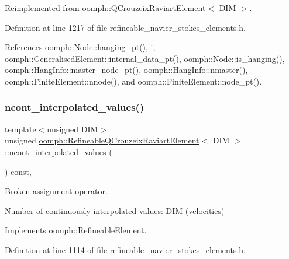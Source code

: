 Reimplemented from \hyperlink{classoomph_1_1QCrouzeixRaviartElement_ae57ed7defb77ccaa537a5d9caae68172}{oomph\+::\+Q\+Crouzeix\+Raviart\+Element$<$ D\+I\+M $>$}.



Definition at line 1217 of file refineable\+\_\+navier\+\_\+stokes\+\_\+elements.\+h.



References oomph\+::\+Node\+::hanging\+\_\+pt(), i, oomph\+::\+Generalised\+Element\+::internal\+\_\+data\+\_\+pt(), oomph\+::\+Node\+::is\+\_\+hanging(), oomph\+::\+Hang\+Info\+::master\+\_\+node\+\_\+pt(), oomph\+::\+Hang\+Info\+::nmaster(), oomph\+::\+Finite\+Element\+::nnode(), and oomph\+::\+Finite\+Element\+::node\+\_\+pt().

\mbox{\label{classoomph_1_1RefineableQCrouzeixRaviartElement_a3f6b1ffd6ae7beef75c2347df90ec701}} 
\subsubsection{\texorpdfstring{ncont\+\_\+interpolated\+\_\+values()}{ncont\_interpolated\_values()}}
{\footnotesize\ttfamily template$<$unsigned D\+IM$>$ \\
unsigned \hyperlink{classoomph_1_1RefineableQCrouzeixRaviartElement}{oomph\+::\+Refineable\+Q\+Crouzeix\+Raviart\+Element}$<$ D\+IM $>$\+::ncont\+\_\+interpolated\+\_\+values (\begin{DoxyParamCaption}{ }\end{DoxyParamCaption}) const\hspace{0.3cm}{\ttfamily [inline]}, {\ttfamily [virtual]}}



Broken assignment operator. 

Number of continuously interpolated values\+: D\+IM (velocities) 

Implements \hyperlink{classoomph_1_1RefineableElement_a53e171a18c9f43f1db90a6876516a073}{oomph\+::\+Refineable\+Element}.



Definition at line 1114 of file refineable\+\_\+navier\+\_\+stokes\+\_\+elements.\+h.

